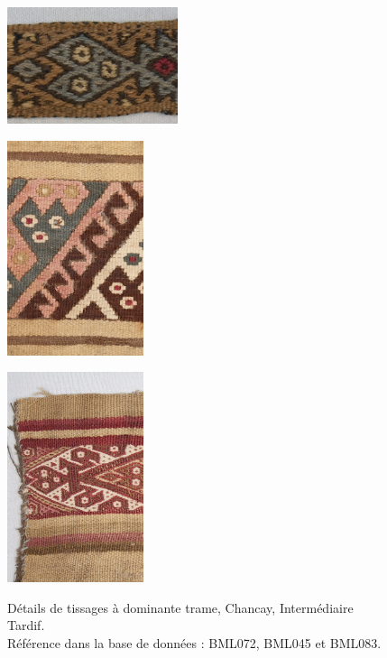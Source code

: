 \begin{figure}[!h]
 \begin{minipage}[c]{.3\linewidth}
        \begin{center}
        		\includegraphics[width=5cm]{../images/BML072.jpg}
		\label{fig:BML072}
	\end{center}
    \end{minipage}
     \begin{minipage}[c]{.3\linewidth}
        \begin{center}
        		\includegraphics[width=4cm]{../images/BML045.jpg}
		\label{fig:BML045}
	\end{center}
    \end{minipage}
    \begin{minipage}[c]{.3\linewidth}
        \begin{center}
        		\includegraphics[width=4cm]{../images/BML083.jpg}
		\label{fig:BML083}
	\end{center}
    \end{minipage}
    \caption{Détails de tissages à dominante trame, Chancay, Intermédiaire Tardif. \\ Référence dans la base de données : BML072, BML045 et BML083.}
\end{figure}


